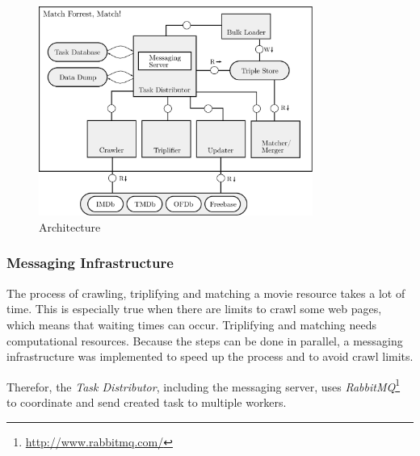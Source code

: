 \begin{figure}[ht]
  \begin{center}
  \includegraphics[width=0.8\textwidth]{images/architecture.pdf}
  \end{center}
  \caption{Architecture}
  \label{fig_architecture}
\end{figure}

\subsubsection{Messaging Infrastructure}
\label{subsubsec_messaging_infrastructure}


The process of crawling, triplifying and matching a movie resource takes a lot of time.
This is especially true when there are limits to crawl some web pages, which means that waiting times can occur.
Triplifying and matching needs computational resources.
Because the steps can be done in parallel, a messaging infrastructure was implemented to speed up the process and to avoid crawl limits.

Therefor, the \textit{Task Distributor}, including the messaging server, uses \emph{RabbitMQ}\footnote{\url{http://www.rabbitmq.com/}} to coordinate and send created task to multiple workers.

